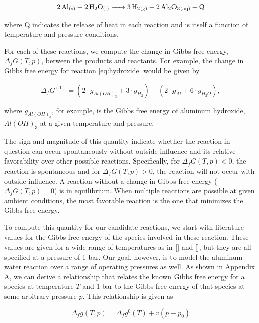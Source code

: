 \documentclass[preprint,12pt,3p]{elsarticle}
\begin{document}
\begin{equation}
  \ce{2Al_{(s)} + 2H2O_{(l)} -> 3H2_{(g)} + 2Al2O3_{(aq)} + Q}
  \label{eq:oxide}
\end{equation}

\noindent where Q indicates the release of heat in each reaction and is itself a
function of temperature and pressure conditions.

For each of these reactions, we compute the change in Gibbs free energy,
$\Delta_fG(T,p)$, between the products and reactants. For example, the change in
Gibbs free energy for reaction \ref{eq:hydroxide} would be given by

\begin{equation}
  \Delta_fG^{(1)} = (2\cdot g_{Al(OH)_3} + 3\cdot g_{H_2}) - (2\cdot g_{Al} + 6\cdot g_{H_2O}),
\end{equation}

\noindent where $g_{Al(OH)_3}$, for example, is the Gibbs free energy of
aluminum hydroxide, $Al(OH)_3$ at a given temperature and pressure.

The sign and magnitude of this quantity indicate whether the reaction in
question can occur spontaneously without outside influence and its relative
favorability over other possible reactions. Specifically, for $\Delta_fG(T,p) <
0$, the reaction is spontaneous and for $\Delta_fG(T,p) > 0$, the reaction will
not occur with outside influence. A reaction without a change in Gibbs free
energy ($\Delta_fG(T,p) = 0$) is in equilibrium. When multiple reactions are
possible at given ambient conditions, the most favorable reaction is the one
that minimizes the Gibbs free energy.

To compute this quantity for our candidate reactions, we start with literature
values for the Gibbs free energy of the species involved in these reaction.
These values are given for a wide range of temperatures as in [] and [], but
they are all specified at a pressure of 1 bar. Our goal, however, is to model
the aluminum water reaction over a range of operating pressures as well.  As
shown in Appendix A, we can derive a relationship that relates the known Gibbs
free energy for a species at temperature $T$ and 1 bar to the Gibbs free energy
of that species at some arbitrary pressure $p$. This relationship is given as

\begin{equation}
  \Delta_f g(T,p) = \Delta_f g^{0}(T) + v(p-p_0)
  \label{eq:gibbs_solid}
\end{equation}
\end{document}
